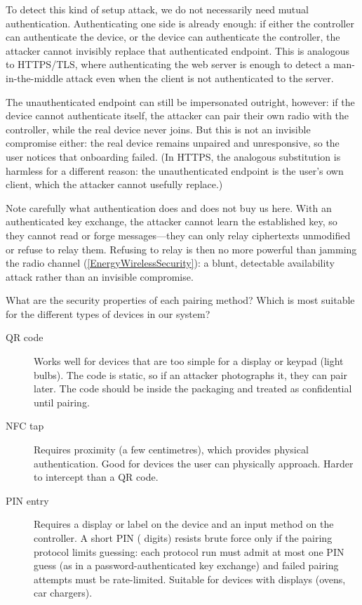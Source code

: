 To detect this kind of setup attack, we do not necessarily need mutual
authentication.
Authenticating one side is already enough: if either the controller can
authenticate the device, or the device can authenticate the controller, the
attacker cannot invisibly replace that authenticated endpoint.
This is analogous to HTTPS/TLS, where authenticating the web server is enough
to detect a man-in-the-middle attack even when the client is not authenticated
to the server.

The unauthenticated endpoint can still be impersonated outright, however:
if the device cannot authenticate itself, the attacker can pair their own
radio with the controller, while the real device never joins.
But this is not an invisible compromise either: the real device remains
unpaired and unresponsive, so the user notices that onboarding failed.
(In HTTPS, the analogous substitution is harmless for a different reason:
the unauthenticated endpoint is the user's own client, which the attacker
cannot usefully replace.)

Note carefully what authentication does and does not buy us here.
With an authenticated key exchange, the attacker cannot learn the
established key, so they cannot read or forge messages---they can only
relay ciphertexts unmodified or refuse to relay them.
Refusing to relay is then no more powerful than jamming the radio channel
(\cref{EnergyWirelessSecurity}): a blunt, detectable availability attack
rather than an invisible compromise.

\begin{exercise}
  What are the security properties of each pairing method?
  Which is most suitable for the different types of devices in our system?
\end{exercise}

\begin{description}
  \item[QR code] Works well for devices that are too simple for a display or
    keypad (\eg light bulbs).
    The code is static, so if an attacker photographs it, they can pair
    later.
    The code should be inside the packaging and treated as confidential
    until pairing.
  \item[NFC tap] Requires proximity (a few centimetres), which provides
    physical authentication.
    Good for devices the user can physically approach.
    Harder to intercept than a QR code.
  \item[PIN entry] Requires a display or label on the device and an input
    method on the controller.
    A short PIN ( digits) resists brute force only if the pairing
    protocol limits guessing: each protocol run must admit at most one
    PIN guess (as in a password-authenticated key exchange) and failed
    pairing attempts must be rate-limited.
    Suitable for devices with displays (\eg ovens, car chargers).
\end{description}

